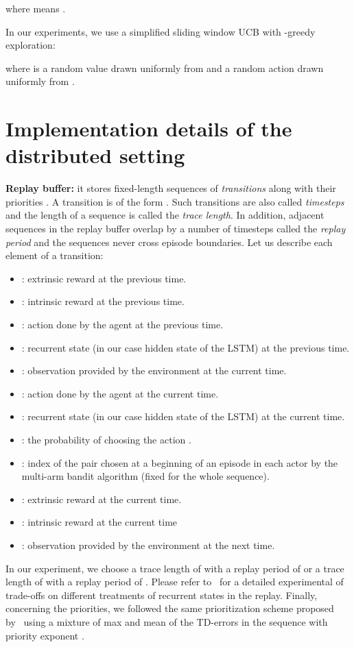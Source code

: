 \documentclass{article}
\begin{document}
where  means .

In our experiments, we use a simplified sliding window UCB with -greedy exploration:

where  is a random value drawn uniformly from  and  a random action drawn uniformly from . \section{Implementation details of the distributed setting}
\label{app:distributed}

{\bf Replay buffer:} it stores fixed-length sequences of \emph{transitions}  along with their priorities .
A transition is of the form  . Such transitions are also called \emph{timesteps} and the length of a sequence  is called the \emph{trace length}. In addition, adjacent sequences in the replay buffer overlap by a number of timesteps called the \emph{replay period} and the sequences never cross episode boundaries. Let us describe each element of a transition:
\begin{itemize}
    \item : extrinsic reward at the previous time.
    \item : intrinsic reward at the previous time.
    \item : action done by the agent at the previous time.
    \item : recurrent state (in our case hidden state of the LSTM) at the previous time.
    \item : observation provided by the environment at the current time.
    \item : action done by the agent at the current time.
    \item : recurrent state (in our case hidden state of the LSTM) at the current time.
    \item : the probability of choosing the action .
    \item : index of the pair  chosen at a beginning of an episode in each actor by the multi-arm bandit algorithm (fixed for the whole sequence).
    \item : extrinsic reward at the current time.
    \item : intrinsic reward at the current time
    \item : observation provided by the environment at the next time.
\end{itemize}
In our experiment, we choose a trace length of  with a replay period of  or a trace length of  with a replay period of .
Please refer to~\citep{kapturowski2018recurrent} for a detailed experimental of trade-offs on different treatments of recurrent states in the replay. Finally, concerning the priorities, we followed the same prioritization scheme proposed by~\citet{kapturowski2018recurrent} using a mixture of max and mean of the TD-errors in the sequence with priority exponent .
\end{document}
